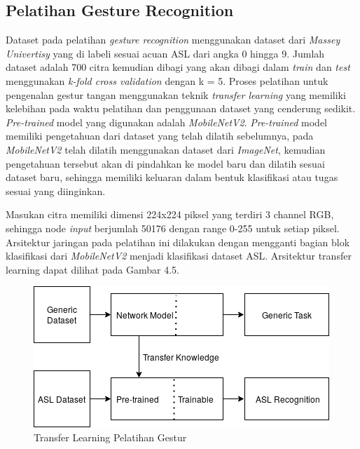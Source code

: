 \subsection{Pelatihan Gesture Recognition}
Dataset pada pelatihan \emph{gesture recognition} menggunakan dataset dari \emph{Massey Univertisy} yang di labeli sesuai acuan ASL dari angka 0 hingga 9. Jumlah dataset adalah 700 citra kemudian dibagi yang akan dibagi dalam \emph{train} dan \emph{test} menggunakan \emph{k-fold cross validation} dengan k = 5.
Proses pelatihan untuk pengenalan gestur tangan menggunakan teknik \emph{transfer learning} yang memiliki kelebihan pada waktu pelatihan dan penggunaan dataset yang cenderung sedikit. \emph{Pre-trained} model yang digunakan adalah \emph{MobileNetV2}. \emph{Pre-trained} model memiliki pengetahuan dari dataset yang telah dilatih sebelumnya, pada \emph{MobileNetV2} telah dilatih menggunakan dataset dari \emph{ImageNet}, kemudian pengetahuan tersebut akan di pindahkan ke model baru dan dilatih sesuai dataset baru, sehingga memiliki keluaran dalam bentuk klasifikasi atau tugas sesuai yang diinginkan.

Masukan citra memiliki dimensi 224x224 piksel yang terdiri 3 channel RGB, sehingga node \emph{input} berjumlah 50176 dengan range 0-255 untuk setiap piksel. Arsitektur jaringan pada pelatihan ini dilakukan dengan mengganti bagian blok klasifikasi dari \emph{MobileNetV2} menjadi klasifikasi dataset ASL. 
Arsitektur transfer learning dapat dilihat pada Gambar 4.5.
\begin{figure}[H]
	\centering
	\includegraphics[width=0.8\linewidth]{transfer}
	\caption{Transfer Learning Pelatihan Gestur}
	\label{fig:asritrkturku}
\end{figure}

